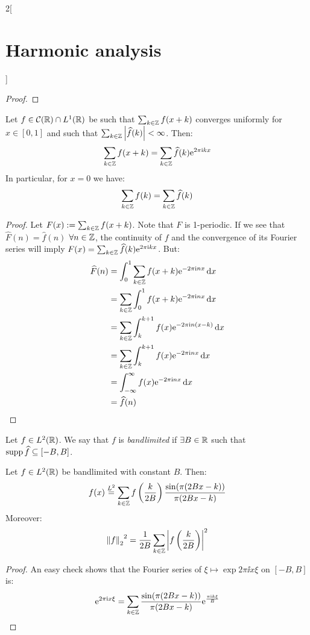 \documentclass[../../../main_math.tex]{subfiles}
\begin{document}
\begin{multicols}{2}[\section{Harmonic analysis}]
\begin{proof}
  \end{proof}
  \begin{theorem}
    Let $f\in\mathcal{C}(\mathbb{R})\cap L^1(\mathbb{R})$ be such that $\sum_{k\in\mathbb{Z}}f(x+k)$ converges uniformly for $x\in[0,1]$ and such that $\sum_{k\in\mathbb{Z}}\abs{\widehat{f}(k)}<\infty$. Then:
    $$\sum_{k\in\mathbb{Z}}f(x+k)=\sum_{k\in\mathbb{Z}}\widehat{f}(k)\mathrm{e}^{2\pi\mathrm{i} k x}$$
    In particular, for $x=0$ we have:
    $$\sum_{k\in\mathbb{Z}}f(k)=\sum_{k\in\mathbb{Z}}\widehat{f}(k)$$
  \end{theorem}
  \begin{proof}
    Let $F(x):=\sum_{k\in\mathbb{Z}}f(x+k)$. Note that $F$ is 1-periodic. If we see that $\widehat{F}(n)=\widehat{f}(n)$ $\forall n\in\mathbb{Z}$, the continuity of $f$ and the convergence of its Fourier series will imply $F(x)=\sum_{k\in\mathbb{Z}}\widehat{f}(k)\mathrm{e}^{2\pi\mathrm{i} k x}$. But:
    \begin{align*}
      \widehat{F}(n) & =\int_{0}^{1}\sum_{k\in\mathbb{Z}}f(x+k)\mathrm{e}^{-2\pi\mathrm{i} n x}\dd{x}     \\
                     & =\sum_{k\in\mathbb{Z}}\int_{0}^{1}f(x+k)\mathrm{e}^{-2\pi\mathrm{i} n x}\dd{x}     \\
                     & =\sum_{k\in\mathbb{Z}}\int_{k}^{k+1}f(x)\mathrm{e}^{-2\pi\mathrm{i} n (x-k)}\dd{x} \\
                     & =\sum_{k\in\mathbb{Z}}\int_{k}^{k+1}f(x)\mathrm{e}^{-2\pi\mathrm{i} n x}\dd{x}     \\
                     & =\int_{-\infty}^{\infty}f(x)\mathrm{e}^{-2\pi\mathrm{i} n x}\dd{x}          \\
                     & =\widehat{f}(n)
    \end{align*}
  \end{proof}
  \begin{definition}
    Let $f\in L^2(\mathbb{R})$. We say that $f$ is \emph{bandlimited} if $\exists B\in\mathbb{R}$ such that $\operatorname{supp}\widehat{f}\subseteq[-B,B]$.
  \end{definition}
  \begin{theorem}
    Let $f\in L^2(\mathbb{R})$ be bandlimited with constant $B$. Then:
    $$f(x)\overset{L^2}{=}\sum_{k\in\mathbb{Z}}f\left(\frac{k}{2B}\right)\frac{\sin(\pi(2Bx-k))}{\pi(2Bx-k)}$$
    Moreover: $${\left\|f\right\|_2}^2=\frac{1}{2B}\sum_{k\in\mathbb{Z}}\abs{f\left(\frac{k}{2B}\right)}^2$$
  \end{theorem}
  \begin{proof}
    An easy check shows that the Fourier series of $\xi\mapsto\exp{2\pi\ii x\xi}$ on $[-B, B]$ is: $$\mathrm{e}^{2\pi\mathrm{i} x\xi}=\sum_{k\in\mathbb{Z}}\frac{\sin(\pi(2Bx-k))}{\pi(2Bx-k)}\mathrm{e}^{\frac{\pi\mathrm{i} k\xi}{B}}$$

\end{proof}
\end{multicols}
\end{document}
